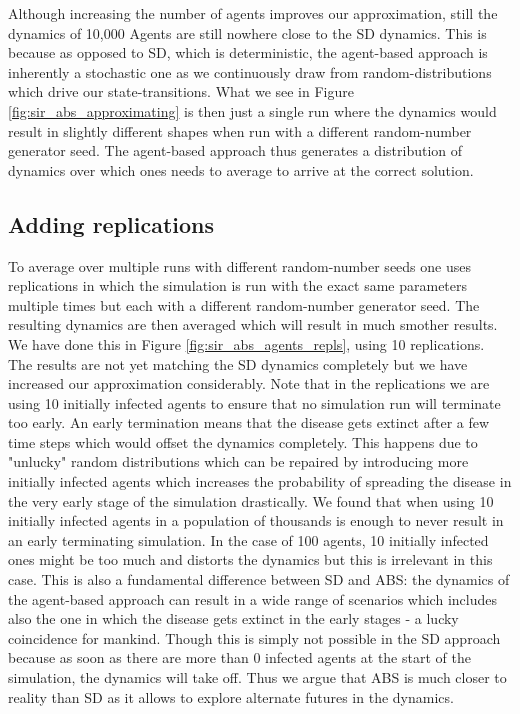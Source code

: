 Although increasing the number of agents improves our approximation, still the dynamics of 10,000 Agents are still nowhere close to the SD dynamics. This is because as opposed to SD, which is deterministic, the agent-based approach is inherently a stochastic one as we continuously draw from random-distributions which drive our state-transitions. What we see in Figure \ref{fig:sir_abs_approximating} is then just a single run where the dynamics would result in slightly different shapes when run with a different random-number generator seed. The agent-based approach thus generates a distribution of dynamics over which ones needs to average to arrive at the correct solution. 

\subsection{Adding replications}
To average over multiple runs with different random-number seeds one uses replications in which the simulation is run with the exact same parameters multiple times but each with a different random-number generator seed. The resulting dynamics are then averaged which will result in much smother results.
We have done this in Figure \ref{fig:sir_abs_agents_repls}, using 10 replications. The results are not yet matching the SD dynamics completely but we have increased our approximation considerably. Note that in the replications we are using 10 initially infected agents to ensure that no simulation run will terminate too early. An early termination means that the disease gets extinct after a few time steps which would offset the dynamics completely. This happens due to "unlucky" random distributions which can be repaired by introducing more initially infected agents which increases the probability of spreading the disease in the very early stage of the simulation drastically. We found that when using 10 initially infected agents in a population of thousands is enough to never result in an early terminating simulation. In the case of 100 agents, 10 initially infected ones might be too much and distorts the dynamics but this is irrelevant in this case. This is also a fundamental difference between SD and ABS: the dynamics of the agent-based approach can result in a wide range of scenarios which includes also the one in which the disease gets extinct in the early stages - a lucky coincidence for mankind. Though this is simply not possible in the SD approach because as soon as there are more than 0 infected agents at the start of the simulation, the dynamics will take off. Thus we argue that ABS is much closer to reality than SD as it allows to explore alternate futures in the dynamics.

